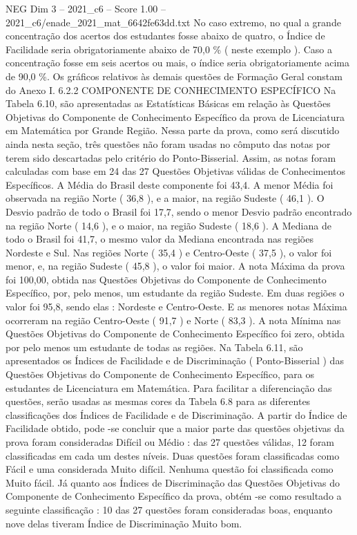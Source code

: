 \begin{textsample}{NEG Dim 3 – 2021\_c6 – Score 1.00 – 2021\_c6/enade\_2021\_mat\_6642fe63dd.txt}
No caso extremo, no qual a grande concentração dos acertos dos estudantes fosse abaixo de quatro, o Índice de Facilidade seria obrigatoriamente abaixo de 70,0 \% ( neste exemplo ).
Caso a concentração fosse em seis acertos ou mais, o índice seria obrigatoriamente acima de 90,0 \%.
Os gráficos relativos às demais questões de Formação Geral constam do Anexo I. 6.2.2 COMPONENTE DE CONHECIMENTO ESPECÍFICO Na Tabela 6.10, são apresentadas as Estatísticas Básicas em relação às Questões Objetivas do Componente de Conhecimento Específico da prova de Licenciatura em Matemática por Grande Região.
Nessa parte da prova, como será discutido ainda nesta seção, três questões não foram usadas no cômputo das notas por terem sido descartadas pelo critério do Ponto-Bisserial.
Assim, as notas foram calculadas com base em 24 das 27 Questões Objetivas válidas de Conhecimentos Específicos.
A Média do Brasil deste componente foi 43,4.
A menor Média foi observada na região Norte ( 36,8 ), e a maior, na região Sudeste ( 46,1 ).
O Desvio padrão de todo o Brasil foi 17,7, sendo o menor Desvio padrão encontrado na região Norte ( 14,6 ), e o maior, na região Sudeste ( 18,6 ).
A Mediana de todo o Brasil foi 41,7, o mesmo valor da Mediana encontrada nas regiões Nordeste e Sul.
Nas regiões Norte ( 35,4 ) e Centro-Oeste ( 37,5 ), o valor foi menor, e, na região Sudeste ( 45,8 ), o valor foi maior.
A nota Máxima da prova foi 100,00, obtida nas Questões Objetivas do Componente de Conhecimento Específico, por, pelo menos, um estudante da região Sudeste.
Em duas regiões o valor foi 95,8, sendo elas : Nordeste e Centro-Oeste.
E as menores notas Máxima ocorreram na região Centro-Oeste ( 91,7 ) e Norte ( 83,3 ).
A nota Mínima nas Questões Objetivas do Componente de Conhecimento Específico foi zero, obtida por pelo menos um estudante de todas as regiões.
Na Tabela 6.11, são apresentados os Índices de Facilidade e de Discriminação ( Ponto-Bisserial ) das Questões Objetivas do Componente de Conhecimento Específico, para os estudantes de Licenciatura em Matemática.
Para facilitar a diferenciação das questões, serão usadas as mesmas cores da Tabela 6.8 para as diferentes classificações dos Índices de Facilidade e de Discriminação.
A partir do Índice de Facilidade obtido, pode -se concluir que a maior parte das questões objetivas da prova foram consideradas Difícil ou Médio : das 27 questões válidas, 12 foram classificadas em cada um destes níveis.
Duas questões foram classificadas como Fácil e uma considerada Muito difícil.
Nenhuma questão foi classificada como Muito fácil.
Já quanto aos Índices de Discriminação das Questões Objetivas do Componente de Conhecimento Específico da prova, obtém -se como resultado a seguinte classificação : 10 das 27 questões foram consideradas boas, enquanto nove delas tiveram Índice de Discriminação Muito bom.

\end{textsample}
